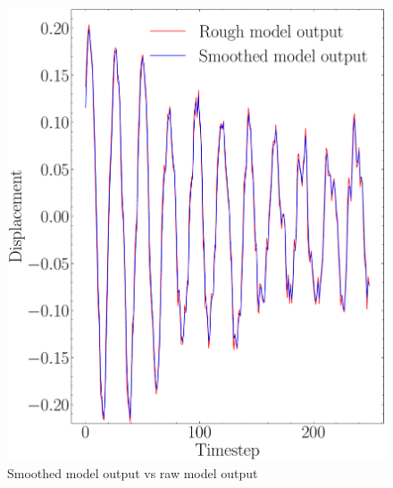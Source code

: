 \begin{figure}[H]
    \centering
    \includegraphics[scale=0.3]{images/fig_chapter4/nn_related/rough_mo_smooth_mo.pdf}
    \caption{Smoothed model output vs raw model output}
    \label{fig:rough_mo_smooth_mo}
\end{figure}

